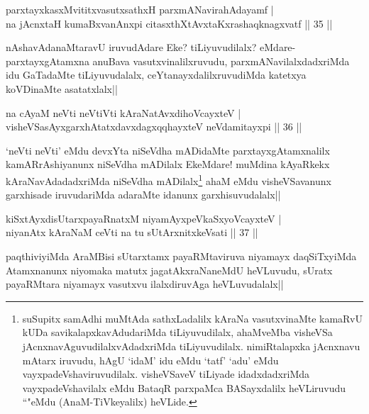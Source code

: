 \begin{shl}
parxtayxkasxMvititxvasutxsathxH parxmANavirahAdayamf |\\
na jAcnxtaH kumaBxvanAnxpi citasxthXtAvxtaKxrashaqknagxvatf \hfill || 35 ||
\end{shl}

\begin{artha}
nAshavAdanaMtaravU iruvudAdare Eke? tiLiyuvudilalx? eMdare- parxtayxgAtamxna anuBava vasutxvinalilxruvudu, parxmANavilalxdadxriMda idu GaTadaMte tiLiyuvudalalx, ceYtanayxdalilxruvudiMda katetxya koVDinaMte asatatxlalx||
\end{artha}


\begin{shl}
na cAyaM neVti neVtiVti kAraNatAvxdihoVcayxteV |\\
visheVSasAyxgarxhAtatxdavxdagxqqhayxteV neVdamitayxpi \hfill || 36 ||
\end{shl}

\begin{artha}
`neVti neVti' eMdu devxYta niSeVdha mADidaMte parxtayxgAtamxnalilx kamARrAshiyanunx niSeVdha mADilalx EkeMdare! muMdina kAyaRkekx kAraNavAdadadxriMda niSeVdha mADilalx\footnote[1]{suSupitx samAdhi muMtAda sathxLadalilx kAraNa vasutxvinaMte kamaRvU kUDa savikalapxkavAdudariMda tiLiyuvudilalx, ahaMveMba visheVSa jAcnxnavAguvudilalxvAdadxriMda tiLiyuvudilalx. nimiRtalapxka jAcnxnavu mAtarx iruvudu, hAgU `idaM' idu eMdu `tatf' `adu' eMdu vayxpadeVshaviruvudilalx. visheVSaveV tiLiyade idadxdadxriMda vayxpadeVshavilalx eMdu BataqR parxpaMca BASayxdalilx heVLiruvudu ``\stext "eMdu (AnaM-TiVkeyalilx) heVLide.} ahaM eMdu visheVSavanunx garxhisade iruvudariMda adaraMte idanunx garxhisuvudalalx||
\end{artha}

\begin{shl}
kiSxtAyxdisUtarxpayaRnatxM niyamAyxpeVkaSxyoVcayxteV |\\
niyanAtx kAraNaM ceVti na tu sUtArxnitxkeV\s sati \hfill || 37 ||
\end{shl}

\begin{artha}%
paqthiviyiMda AraMBisi sUtarxtamx payaRMtaviruva niyamayx daqSiTxyiMda Atamxnanunx niyomaka matutx jagatAkxraNaneMdU heVLuvudu, sUratx payaRMtara niyamayx vasutxvu ilalxdiruvAga heVLuvudalalx||
\end{artha}

